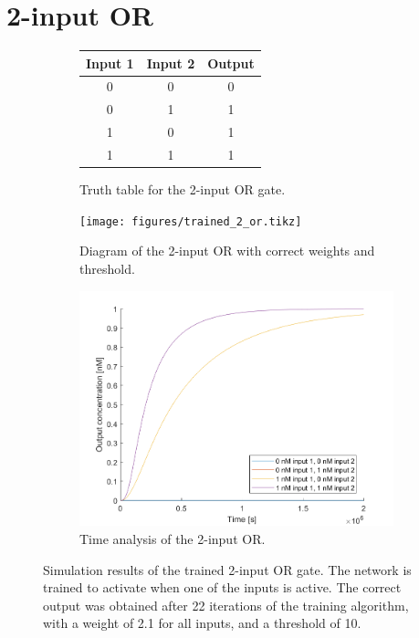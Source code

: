 \section{2-input OR}

\begin{figure}[H]
  \begin{subfigure}[t]{.49\columnwidth}

      \centering
    \begin{tabular}[b]{ccc}
      \hline
    \multicolumn{1}{l}{\textbf{Input 1}} & \multicolumn{1}{l}{\textbf{Input 2}} & \multicolumn{1}{l}{\textbf{Output}} \\
    \hline
    0                                    & 0                                    & 0                                   \\
    0                                    & 1                                    & 1                                   \\
    1                                    & 0                                    & 1                                   \\
    1                                    & 1                                    & 1 \\
    \hline
    \end{tabular}
    \caption{Truth table for the 2-input OR gate.}
\end{subfigure}
\begin{subfigure}[t]{.49\textwidth}
  \texttt{[image: figures/trained\_2\_or.tikz]}
  \caption{Diagram of the 2-input OR with correct weights and threshold.}
\end{subfigure}
\hfill
\begin{subfigure}[t]{\textwidth}
  \centering
\includegraphics[width=\textwidth]{images/or_simulation.png}
\caption{Time analysis of the 2-input OR.}
\end{subfigure}
\caption{Simulation results of the trained 2-input OR gate. The network is trained to activate when one of the inputs is active. The correct output was obtained after 22 iterations of the training algorithm, with a weight of 2.1 for all inputs, and a threshold of 10.}
\label{2_or}
\end{figure}

